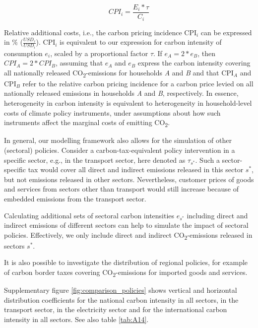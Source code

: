\documentclass[12pt, a4paper]{article}
\begin{document}
\begin{refsection}
\begin{equation}
    CPI_{i} = \frac{E_{i}*\tau}{C_{i}}
\end{equation}

Relative additional costs, i.e., the carbon pricing incidence CPI$_{i}$ can be expressed in \% ($\frac{USD_{\tau}}{USD_{i}}$). CPI$_{i}$ is equivalent to our expression for carbon intensity of consumption $e_{i}$, scaled by a proportional factor $\tau$. If $e_{A}=2*e_{B}$, then $CPI_{A}=2*CPI_{B}$, assuming that $e_{A}$ and $e_{B}$ express the carbon intensity covering all nationally released CO\textsubscript{2}-emissions for households \textit{A} and \textit{B} and that CPI$_{A}$ and CPI$_{B}$ refer to the relative carbon pricing incidence for a carbon price levied on all nationally released emissions in households \textit{A} and \textit{B}, respectively. In essence, heterogeneity in carbon intensity is equivalent to heterogeneity in household-level costs of climate policy instruments, under assumptions about how such instruments affect the marginal costs of emitting CO\textsubscript{2}.

In general, our modelling framework also allows for the simulation of other (sectoral) policies. Consider a carbon-tax-equivalent policy intervention in a specific sector, e.g., in the transport sector, here denoted as $\tau_{s^{*}}$. Such a sector-specific tax would cover all direct and indirect emissions released in this sector $s^{*}$, but not emissions released in other sectors. Nevertheless, customer prices of goods and services from sectors other than transport would still increase because of embedded emissions from the transport sector.

Calculating additional sets of sectoral carbon intensities $e_{s^{*}}$ including direct and indirect emissions of different sectors can help to simulate the impact of sectoral policies. Effectively, we only include direct and indirect CO\textsubscript{2}-emissions released in sectors $s^{*}$.

It is also possible to investigate the distribution of regional policies, for example of carbon border taxes covering CO\textsubscript{2}-emissions for imported goods and services. 

Supplementary figure \ref{fig:comparison_policies} shows vertical and horizontal distribution coefficients for the national carbon intensity in all sectors, in the transport sector, in the electricity sector and for the international carbon intensity in all sectors. See also table \ref{tab:A14}.


\end{refsection}
\end{document}
